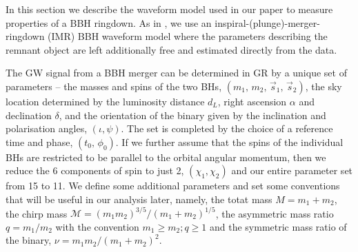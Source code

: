 

In this section we describe the waveform model used in our paper to measure properties of a BBH ringdown. As in \cite{Brito:2018rfr,Ghosh:2021mrv}, we use an inspiral-(plunge)-merger-ringdown (IMR) BBH waveform model where the parameters describing the remnant object are left additionally free and estimated directly from the data.

The GW signal from a BBH merger can be determined in GR by a unique set of parameters -- the masses and spins of the two BHs, $(m_1,\, m_2,\, \vec{s}_1,\, \vec{s}_2)$, the sky location determined by the luminosity distance $d_L$, right ascension $\alpha$ and declination $\delta$, and the orientation of the binary given by the inclination and polarisation angles, $(\iota, \psi)$. The set is completed by the choice of a reference time and phase, $(t_0,\, \phi_0)$. If we further assume that the spins of the individual BHs are restricted to be parallel to the orbital angular momentum, then we reduce the 6 components of spin to just 2, $(\chi_1, \chi_2)$ and our entire parameter set from 15 to 11. We define some additional parameters and set some conventions that will be useful in our analysis later, namely, the totat mass $M=m_1+m_2$, the chirp mass $\mathcal {M}=(m_{1}m_{2})^{3/5}/(m_{1}+m_{2})^{1/5}$, the asymmetric mass ratio $q=m_1/m_2$ with the convention $m_1 \geqslant m_2; q \geqslant 1$ and the symmetric mass ratio of the binary, $\nu = m_1m_2/(m_1+m_2)^2$.

